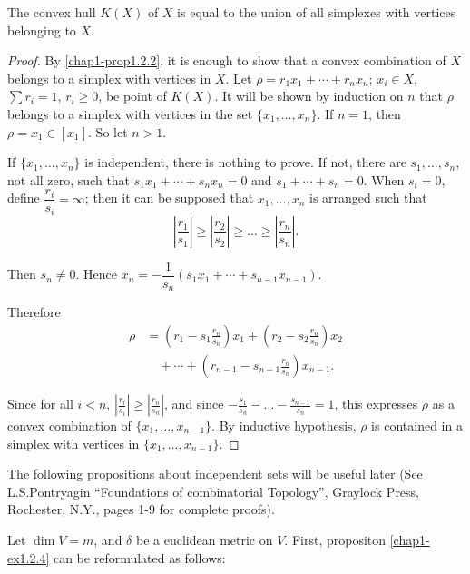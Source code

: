 \begin{proposition}\label{chap1-prop1.2.7}
The convex hull $K(X)$ of $X$ is equal to the union of all simplexes with vertices belonging to $X$.
\end{proposition}

\begin{proof}
By \ref{chap1-prop1.2.2}, it is enough to show that a convex combination of $X$ belongs to a simplex with vertices in $X$. Let $\rho=r_{1}x_{1}+\cdots+r_{n}x_{n}$; $x_{i}\in X$, $\sum r_{i}=1$, $r_{i}\geq 0$, be point of $K(X)$. It will be shown by induction on $n$ that $\rho$ belongs to a simplex with vertices in the set $\{x_{1},\ldots,x_{n}\}$. If $n=1$, then $\rho=x_{1}\in [x_{1}]$. So let $n>1$.

If $\{x_{1},\ldots,x_{n}\}$ is independent, there is nothing to prove. If not, there are $s_{1},\ldots,s_{n}$, not all zero, such that $s_{1}x_{1}+\cdots+s_{n}x_{n}=0$ and $s_{1}+\cdots+s_{n}=0$. When $s_{i}=0$, define $\dfrac{r_{i}}{s_{i}}=\infty$; then it can be supposed that $x_{1},\ldots,x_{n}$ is arranged such that
$$
\left|\frac{r_{1}}{s_{1}}\right|\geq \left|\frac{r_{2}}{s_{2}}\right|\geq\ldots\geq\left|\frac{r_{n}}{s_{n}}\right|. 
$$

Then $s_{n}\neq 0$. Hence $x_{n}=-\dfrac{1}{s_{n}}(s_{1}x_{1}+\cdots+s_{n-1}x_{n-1})$. 

Therefore\pageoriginale
\begin{align*}
\rho &= \left(r_{1}-s_{1}\frac{r_{n}}{s_{n}}\right)x_{1}+\left(r_{2}-s_{2}\frac{r_{n}}{s_{n}}\right)x_{2}\\
&\quad +\cdots+\left(r_{n-1}-s_{n-1}\frac{r_{n}}{s_{n}}\right)x_{n-1}. 
\end{align*}

Since for all $i<n$, $\left|\frac{r_{i}}{s_{i}}\right|\geq \left|\frac{r_{n}}{s_{n}}\right|$, and since $-\frac{s_{1}}{s_{n}}-\ldots-\frac{s_{n-1}}{s_{n}}=1$, this expresses $\rho$ as a convex combination of $\{x_{1},\ldots,x_{n-1}\}$. By inductive hypothesis, $\rho$ is contained in a simplex with vertices in $\{x_{1},\ldots,x_{n-1}\}$.
\end{proof}

The following propositions about independent sets will be useful later (See L.S.\@ Pontryagin ``Foundations of combinatorial Topology'', Graylock Press, Rochester, N.Y., pages 1-9 for complete proofs).

Let $\dim V=m$, and $\delta$ be a euclidean metric on $V$. First, propositon \ref{chap1-ex1.2.4} can be reformulated as follows: 

